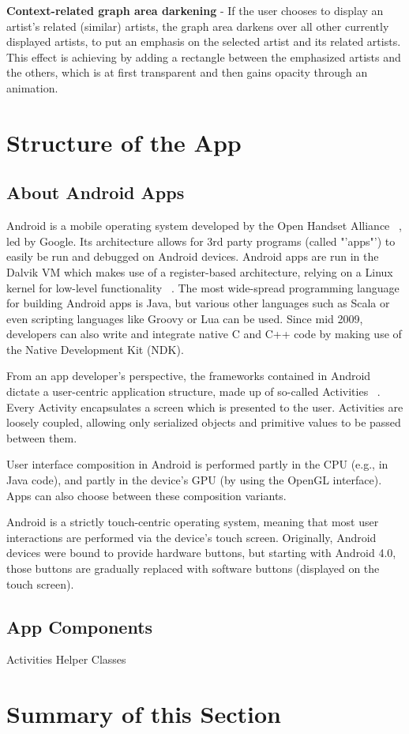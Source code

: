 \textbf{Context-related graph area darkening} - If the user chooses to display an artist's related (similar) artists, the graph area darkens over all other currently displayed artists, to put an emphasis on the selected artist and its related artists. This effect is achieving by adding a rectangle between the emphasized artists and the others, which is at first transparent and then gains opacity through an animation.

\section{Structure of the App}

\subsection{About Android Apps}

Android is a mobile operating system developed by the Open Handset Alliance ~\cite{url:openhandsetalliance}, led by Google. Its architecture allows for 3rd party programs (called "'apps"') to easily be run and debugged on Android devices.
Android apps are run in the Dalvik VM which makes use of a register-based architecture, relying on a Linux kernel for low-level functionality ~\cite{dalvik}. The most wide-spread programming language for building Android apps is Java, but various other languages such as Scala or even scripting languages like Groovy or Lua can be used. Since mid 2009, developers can also write and integrate native C and C++ code by making use of the Native Development Kit (NDK).

From an app developer's perspective, the frameworks contained in Android dictate a user-centric application structure, made up of so-called Activities ~\cite{url:androidactivity}. Every Activity encapsulates a screen which is presented to the user. Activities are loosely coupled, allowing only serialized objects and primitive values to be passed between them.

User interface composition in Android is performed partly in the CPU (e.g., in Java code), and partly in the device's GPU (by using the OpenGL interface). Apps can also choose between these composition variants.

Android is a strictly touch-centric operating system, meaning that most user interactions are performed via the device's touch screen. Originally, Android devices were bound to provide hardware buttons, but starting with Android 4.0, those buttons are gradually replaced with software buttons (displayed on the touch screen).

\subsection{App Components}

Activities
Helper Classes

\section{Summary of this Section}